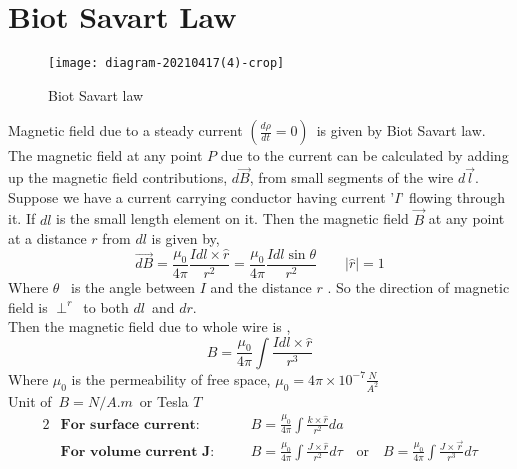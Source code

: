 \section{Biot Savart Law}
 \begin{wrapfigure}{r}{0.25\textwidth}
	\begin{center}
		\texttt{[image: diagram-20210417(4)-crop]}
	\end{center}
	\caption{Biot Savart law}
\end{wrapfigure}
Magnetic field due to a steady current ${(\frac{d\rho}{dt}=0)}$\ is given by Biot Savart law.
The magnetic field at any point $P$ due to the current can be calculated by adding up the magnetic field contributions, $d \vec{{B}}$, from small segments of the wire $d \vec{l}$.
	\\Suppose we have a current carrying conductor having current '$I$' flowing through it. If $dl$ is the small length element on it. Then the magnetic field $\vec{B}$ at any point at a distance $r$ from $dl$ is given by,
	\begin{equation}\label{key}
	\vec{dB}={\frac{\mu_0}{4\pi}\frac{Idl\times{\hat{r}}}{r^2}}=\frac{\mu_0}{4\pi}\frac{Idl\sin\theta}{r^2}\qquad \vert{\hat{r}\vert}=1
	\end{equation}
	Where $\theta$ \ is the angle between $I$ and the distance $r$ . So the direction of magnetic field is $\perp^r$\ to both $dl$\ and $dr$. \\Then the magnetic field due to whole wire is ,
		\begin{equation}\label{key}
		B=\frac{\mu_0}{4\pi}\int\frac{Idl\times\hat{r}}{r^3}
		\end{equation}
 Where $\mu_0$ is the permeability of free space, $ \mu_0=4\pi\times10^{-7}\frac{N}{A^2}$\\
Unit of\ $B =N/A.m $\ or Tesla $T$
	\begin{alignat*}{2}
	&\textbf{For surface current:}\quad  &&B=\frac{\mu_0}{4\pi}\int\frac{k\times\hat{r}}{r^2}da\\ 
	&\textbf{For volume current J:}\quad  &&B=\frac{\mu_0}{4\pi}\int\frac{J\times\hat{r}}{r^2}d\tau \quad \text{or}\quad B=\frac{\mu_0}{4\pi}\int\frac{J\times\vec{r}}{r^3}d\tau\\
	\end{alignat*}
